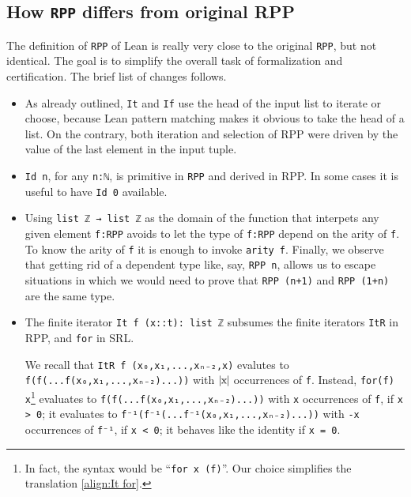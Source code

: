 \documentclass[runningheads]{llncs}
\newcommand{\RPP}{\textsf{RPP}\xspace}
\newcommand{\LEAN}{\textsf{Lean}\xspace}
\newcommand{\SRL}{\textsf{SRL}\xspace}
\begin{document}
\subsection{How {\normalfont \lstinline|RPP|} differs from original {\normalfont \RPP}}
The definition of \lstinline|RPP| of \LEAN is really very close to the original \lstinline|RPP|, but not identical. The goal is to simplify the overall task of formalization and certification. The brief list of changes follows.
\begin{itemize}
    \item As already outlined, \lstinline|It| and \lstinline|If| use the head of the input list to iterate or choose, because \LEAN pattern matching makes it obvious to take the head of a list. On the contrary, both iteration and selection of \RPP were driven by the value of the last element in the input tuple.

    \item \lstinline|Id n|, for any \lstinline|n:ℕ|, is primitive in \lstinline|RPP| and derived in \RPP. In some cases it is useful to have \lstinline|Id 0| available.

    \item Using \lstinline|list ℤ → list ℤ| as the domain of the function that interpets any given element \lstinline|f:RPP| avoids to let the type of \lstinline|f:RPP| depend on the arity of \lstinline|f|. To know the arity of \lstinline|f| it is enough to invoke \lstinline|arity f|. Finally, we observe that getting rid of a dependent type like, say, \lstinline|RPP n|, allows us to escape situations in which we would need to prove that \lstinline|RPP (n+1)| and \lstinline|RPP (1+n)| are the same type.

    \item The finite iterator \lstinline|It f (x::t): list ℤ| subsumes the finite iterators \lstinline|ItR| in \RPP, and \lstinline|for| in \SRL.

    We recall that \lstinline|ItR f (x₀,x₁,...,xₙ₋₂,x)| evalutes to \lstinline|f(f(...f(x₀,x₁,...,xₙ₋₂)...))| with $ \mid\!\!\mbox{\lstinline|x|}\!\!\mid $ occurrences of \lstinline|f|.
    Instead, \lstinline|for(f) x|\footnote{In fact, the syntax would be ``\lstinline|for x (f)|''. Our choice simplifies the translation \eqref{align:It for}.} evaluates to \lstinline|f(f(...f(x₀,x₁,...,xₙ₋₂)...))| with \lstinline|x| occurrences of \lstinline|f|, if \lstinline|x > 0|; it evaluates to \lstinline|f⁻¹(f⁻¹(...f⁻¹(x₀,x₁,...,xₙ₋₂)...))| with \lstinline|-x| occurrences of \lstinline|f⁻¹|, if \lstinline|x < 0|; it behaves like the identity if \lstinline|x = 0|.


\end{itemize}
\end{document}
